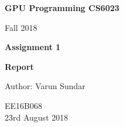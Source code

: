 \begin{titlepage}
    \begin{center}
        \vspace*{1cm}
        
        \Huge
          \textbf{GPU Programming CS6023}
        
        \vspace{0.5cm}
        \LARGE
        Fall 2018
        
        \vspace{1.5cm}
        
        \textbf{Assignment 1}
   		  \vspace{1.5cm}
        
        \textbf{Report}
       
        \vfill
        
        Author: Varun Sundar
        
        \vspace{0.8cm}
          \Large
        EE16B068 \\
        \vspace{0.5cm}
       23rd August 2018
        
    \end{center}
\end{titlepage}